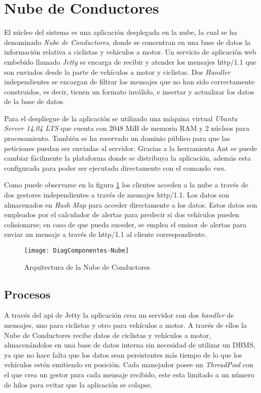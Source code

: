 \section{Nube de Conductores}\label{section:NubeConductores}
El núcleo del sistema es una aplicación desplegada en la nube, la cual se ha denominado \emph{Nube de Conductores}, donde se concentran en una base de datos la información relativa a ciclistas y vehículos a motor. Un servicio de aplicación web embebido llamado \emph{Jetty} se encarga de recibir y atender los mensajes \Gls{http/1.1} que son enviados desde la parte de vehículos a motor y ciclistas. Dos \emph{Handler} independientes se encargan de filtrar los mensajes que no han sido correctamente construidos, es decir, tienen un formato inválido, e insertar y actualizar los datos de la base de datos.

Para el despliegue de la aplicación se utilizado una máquina virtual \emph{Ubuntu Server 14.04 LTS} que cuenta con 2048 MiB de memoria RAM y 2 núcleos para procesamiento. También se ha reservado un dominio público para que las peticiones puedan ser enviadas al servidor. Gracias a la herramienta Ant se puede cambiar fácilmente la plataforma donde se distribuya la aplicación, además esta configurada para poder ser ejecutada directamente con el comando \emph{run}.

Como puede observarse en la figura \ref{fig:DiagComponentes-Nube} los clientes acceden a la nube a través de dos gestores independientes a través de mensajes \gls{http/1.1}. Los datos son almacenados en \emph{Hash Map} para acceder directamente a los datos. Estos datos son empleados por el calculador de alertas para predecir si dos vehículos pueden colisionarse; en caso de que pueda suceder, se emplea el emisor de alertas para enviar un mensaje a través de \gls{http/1.1} al cliente correspondiente.

\begin{figure}[H]
	\begin{center}
		\texttt{[image: DiagComponentes-Nube]}
		\caption{Arquitectura de la Nube de Conductores}
		\label{fig:DiagComponentes-Nube}
	\end{center}
\end{figure}

\subsection{Procesos}\label{ssection:procesos}
A través del \gls{api} de Jetty la aplicación crea un servidor con dos \emph{handler} de mensajes, uno para ciclistas y otro para vehículos a motor. A través de ellos la Nube de Conductores recibe datos de ciclistas y vehículos a motor, almacenándolos en una base de datos interna sin necesidad de utilizar un DBMS, ya que no hace falta que los datos sean persistentes más tiempo de lo que los vehículos estén emitiendo su posición. Cada manejador posee un \emph{ThreadPool} con el que crea un gestor para cada mensaje recibido, este esta limitado a un número de hilos para evitar que la aplicación se colapse.


